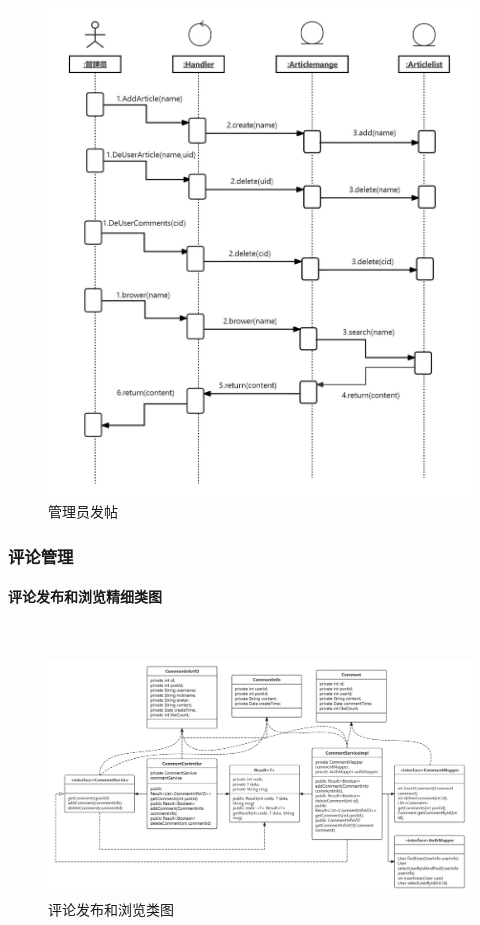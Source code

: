 \documentclass[UTF8]{ctexart}
\newcommand{\subsubsubsection}[1]{\paragraph{#1}\mbox{}\\} %
\begin{document}
\begin{figure}[H]
  \centering
  \includegraphics[scale=0.3]{顺序图/管理员发帖.png}
  \caption{管理员发帖}
\end{figure}



\subsubsection{评论管理}

\subsubsubsection{评论发布和浏览精细类图}

\begin{figure}[H]
  \centering
  \includegraphics[scale=0.2]{精化类模型图/comment.jpg}
  \caption{评论发布和浏览类图}
\end{figure}
\end{document}
